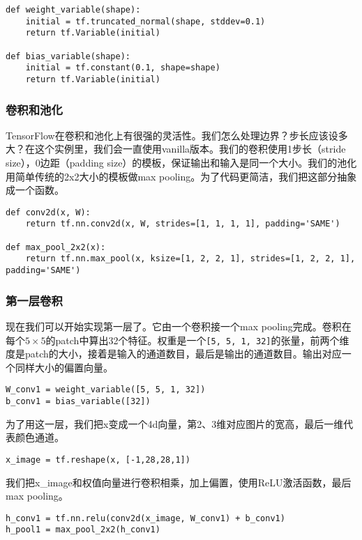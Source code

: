 \begin{lstlisting}
def weight_variable(shape):
    initial = tf.truncated_normal(shape, stddev=0.1)
    return tf.Variable(initial)

def bias_variable(shape):
    initial = tf.constant(0.1, shape=shape)
    return tf.Variable(initial)
\end{lstlisting}

\subsubsection{卷积和池化}

TensorFlow在卷积和池化上有很强的灵活性。我们怎么处理边界？步长应该设多大？在这个实例里，我们会一直使用vanilla版本。我们的卷积使用1步长（stride size），0边距（padding size）的模板，保证输出和输入是同一个大小。我们的池化用简单传统的2x2大小的模板做max pooling。为了代码更简洁，我们把这部分抽象成一个函数。

\begin{lstlisting}
def conv2d(x, W):
    return tf.nn.conv2d(x, W, strides=[1, 1, 1, 1], padding='SAME')

def max_pool_2x2(x):
    return tf.nn.max_pool(x, ksize=[1, 2, 2, 1], strides=[1, 2, 2, 1], padding='SAME')
\end{lstlisting}

\subsubsection{第一层卷积}

现在我们可以开始实现第一层了。它由一个卷积接一个max pooling完成。卷积在每个$5\times5$的patch中算出32个特征。权重是一个\lstinline{[5, 5, 1, 32]}的张量，前两个维度是patch的大小，接着是输入的通道数目，最后是输出的通道数目。输出对应一个同样大小的偏置向量。

\begin{lstlisting}
W_conv1 = weight_variable([5, 5, 1, 32])
b_conv1 = bias_variable([32])
\end{lstlisting}

为了用这一层，我们把x变成一个4d向量，第2、3维对应图片的宽高，最后一维代表颜色通道。

\begin{lstlisting}
x_image = tf.reshape(x, [-1,28,28,1])
\end{lstlisting}

我们把x\_image和权值向量进行卷积相乘，加上偏置，使用ReLU激活函数，最后max pooling。

\begin{lstlisting}
h_conv1 = tf.nn.relu(conv2d(x_image, W_conv1) + b_conv1)
h_pool1 = max_pool_2x2(h_conv1)
\end{lstlisting}

